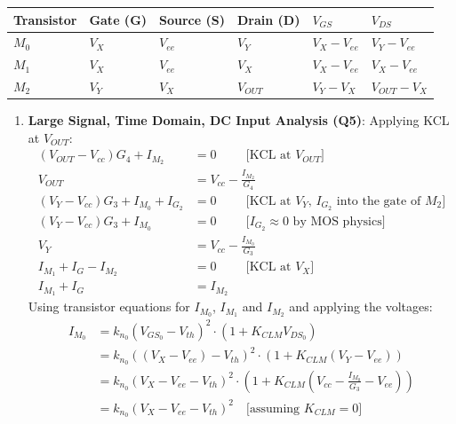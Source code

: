 \noindent\begin{tabularx}{\linewidth}{|X|X|X|X|X|X|} \hline
  Transistor & Gate (G) & Source (S) & Drain (D) & $V_{GS}$ & $V_{DS}$ \\ \hline
  $M_0$ & $V_{X}$ & $V_{ee}$ & $V_{Y}$ & $V_{X} - V_{ee}$ & $V_{Y} - V_{ee}$ \\ \hline
  $M_1$ & $V_{X}$ & $V_{ee}$ & $V_{X}$ & $V_{X} - V_{ee}$ & $V_{X} - V_{ee}$ \\ \hline
  $M_2$ & $V_{Y}$ & $V_{X}$ & $V_{OUT}$ & $V_{Y} - V_{X}$ & $V_{OUT} - V_{X}$ \\ \hline
\end{tabularx}

\begin{enumerate}
  \item \textbf{Large Signal, Time Domain, DC Input Analysis (Q5)}:
    Applying KCL at $V_{OUT}$:
    \begin{align*}
      (V_{OUT} - V_{cc})G_4 + I_{M_2} &= 0 \hspace{1cm} \text{[KCL at } V_{OUT}\text{]} \\
      V_{OUT} &= V_{cc} - \frac{I_{M_2}}{G_4} \tag{1} \\
      (V_{Y} - V_{cc})G_3 + I_{M_0} + I_{G_2} &= 0 \hspace{1cm} \text{[KCL at } V_{Y}\text{, } I_{G_2} \text{ into the gate of } M_2\text{]} \\
      (V_{Y} - V_{cc})G_3 + I_{M_0} &= 0 \hspace{1cm} \text{[} I_{G_2} \approx 0 \text{ by MOS physics]} \\
      V_{Y} &= V_{cc} - \frac{I_{M_0}}{G_3} \tag{2} \\
      I_{M_1} + I_{G} - I_{M_2} &= 0 \hspace{1cm} \text{[KCL at } V_{X}\text{]} \\
      I_{M_1} + I_{G} &= I_{M_2} \tag{3}
    \end{align*}
    Using transistor equations for $I_{M_0}$, $I_{M_1}$ and $I_{M_2}$
    and applying the voltages:
    \begin{align*}
      I_{M_0} &= k_{n_0}(V_{GS_0} - V_{th})^2 \cdot (1 + K_{CLM} V_{DS_0}) \\
              &= k_{n_0}((V_{X} - V_{ee}) - V_{th})^2 \cdot (1 + K_{CLM} (V_{Y} - V_{ee})) \\
              &= k_{n_0}\left(V_{X} - V_{ee} - V_{th}\right)^2 \cdot \left(1 + K_{CLM} \left(V_{cc} - \frac{I_{M_0}}{G_3} - V_{ee}\right)\right) \\
              &= k_{n_0}\left(V_{X} - V_{ee} - V_{th}\right)^2 \quad \text{[assuming } K_{CLM} = 0 \text{]} \tag{4} \\ \\

\end{align*}
\end{enumerate}
